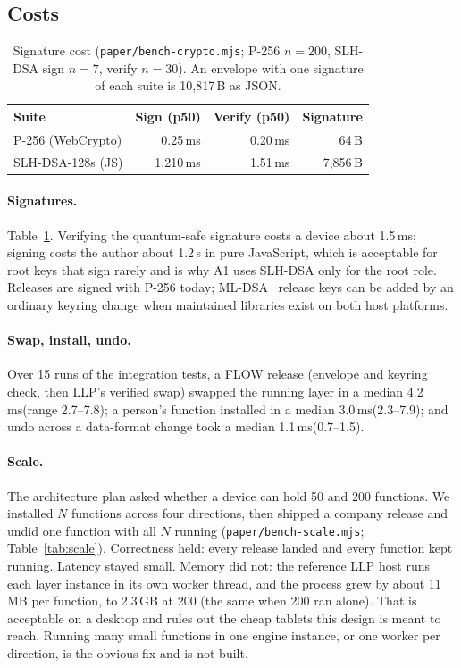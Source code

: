 \documentclass[10pt,twocolumn]{article}
\newcommand{\code}[1]{\texttt{#1}}
\newcommand{\ms}{\,ms\xspace}
\newcommand{\s}{\,s\xspace}
\begin{document}
\subsection{Costs}

\begin{table}[t]
\centering\footnotesize
\setlength{\tabcolsep}{4pt}\begin{tabular}{@{}lrrr@{}}
\toprule
Suite & Sign (p50) & Verify (p50) & Signature \\
\midrule
P-256 (WebCrypto) & 0.25\ms & 0.20\ms & 64\,B \\
SLH-DSA-128s (JS) & 1{,}210\ms & 1.51\ms & 7{,}856\,B \\
\bottomrule
\end{tabular}
\caption{Signature cost (\code{paper/bench-crypto.mjs}; P-256 $n{=}200$, SLH-DSA sign $n{=}7$,
verify $n{=}30$). An envelope with one signature of each suite is 10{,}817\,B as JSON.}
\label{tab:crypto}
\end{table}

\paragraph{Signatures.} Table~\ref{tab:crypto}. Verifying the quantum-safe signature costs a device
about 1.5\ms; signing costs the author about 1.2\s in pure JavaScript, which is acceptable for root
keys that sign rarely and is why A1 uses SLH-DSA only for the root role. Releases are signed with
P-256 today; ML-DSA~\cite{fips204} release keys can be added by an ordinary keyring change when
maintained libraries exist on both host platforms.

\paragraph{Swap, install, undo.} Over 15 runs of the integration tests, a FLOW release (envelope and
keyring check, then LLP's verified swap) swapped the running layer in a median 4.2\ms (range
2.7--7.8); a person's function installed in a median 3.0\ms (2.3--7.9); and undo across a data-format
change took a median 1.1\ms (0.7--1.5).

\paragraph{Scale.} The architecture plan asked whether a device can hold 50 and 200 functions. We
installed $N$ functions across four directions, then shipped a company release and undid one
function with all $N$ running (\code{paper/bench-scale.mjs}; Table~\ref{tab:scale}). Correctness
held: every release landed and every function kept running. Latency stayed small. Memory did not:
the reference LLP host runs each layer instance in its own worker thread, and the process grew by
about 11\,MB per function, to 2.3\,GB at 200 (the same when 200 ran alone). That is acceptable on a
desktop and rules out the cheap tablets this design is meant to reach. Running many small functions
in one engine instance, or one worker per direction, is the obvious fix and is not built.
\end{document}
